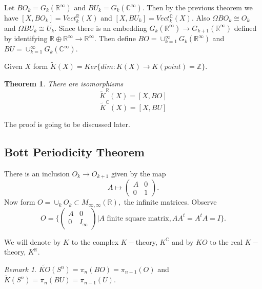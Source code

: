 \documentclass[a4paper,10pt]{article}
\theoremstyle{plain}%
\newtheorem{thm}{Theorem}
\theoremstyle{definition}
\theoremstyle{remark}
\newtheorem{rem}{Remark}
\newcommand{\ZZ}{\mathbb{Z}}
\newcommand{\RR}{\mathbb{R}}
\newcommand{\CC}{\mathbb{C}}
\begin{document}
Let $BO_k = G_k(\RR^\infty)$ and $BU_k = G_k(\CC^\infty)$. Then by the previous theorem we have $[X,BO_k]= Vect_k^\RR(X)$ and $[X,BU_k]= Vect_k^\CC(X)$.  Also $\Omega BO_k \cong O_k$ and $\Omega BU_k \cong U_k.$  Since there is an embedding $G_k(\RR^\infty)\to G_{k+1}(\RR^\infty)$ defined by identifying $\RR\oplus\RR^\infty\to \RR^\infty.$ Then define $BO = \cup_{k=1}^\infty G_k(\RR^\infty)$ and $BU = \cup_{k=1}^\infty G_k(\CC^\infty)$.

Given $X$ form $\tilde{K}(X) = Ker\{dim:K(X)\to K(point) = \ZZ\}.$

\begin{thm}
There are isomorphisms
\[
\tilde{K}^\RR(X) = [X, BO]
\]
\[
\tilde{K}^\CC(X) = [X, BU]
\]
\end{thm}

The proof is going to be discussed later.

\subsection{Bott Periodicity Theorem}

There is an inclusion $O_k\to O_{k+1}$ given by the map
\[A\mapsto \left( 
\begin{array}{cc}
A & 0 \\
0 & 1 
\end{array} \right).\] 
Now form $O = \cup_k O_k\subset M_{\infty,\infty}(\RR),$ the infinite matrices. Observe 
\[O=\bigg\{\left( 
\begin{array}{cc}
A & 0 \\
0 & I_\infty 
\end{array} \right) \bigg| A \text{ finite square matrix}, AA^t = A^tA = I\bigg\}.\] 

We will denote by $K$ to the complex $K-$theory, $K^\CC$ and by $KO$ to the real $K-$theory, $K^\RR.$
\begin{rem}
$\tilde{KO}(S^n) = \pi_n (BO)= \pi_{n-1} (O)$ and
$\tilde{K}(S^n) = \pi_n (BU)= \pi_{n-1} (U).$
\end{rem}
\end{document}
